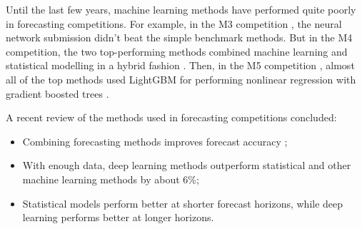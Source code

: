 \documentclass[a4paper,10pt]{article}
\begin{document}
Until the last few years, machine learning methods have performed quite poorly in forecasting competitions. For example, in the M3 competition \citep{M3comp}, the neural network submission didn't beat the simple benchmark methods. But in the M4 competition, the two top-performing methods combined machine learning and statistical modelling in a hybrid fashion \citep{M4results}. Then, in the M5 competition \citep{M5accuracy}, almost all of the top methods used LightGBM for performing nonlinear regression with gradient boosted trees \citep{lightgbm}.

A recent review of the methods used in forecasting competitions \citep{Makridakis2022} concluded:
\begin{itemize}
	\item Combining forecasting methods improves forecast accuracy \citep[see also][]{combinations};
	\item With enough data, deep learning methods outperform statistical and other machine learning methods by about 6\%;
	\item Statistical models perform better at shorter forecast horizons, while deep learning performs better at longer horizons.
\end{itemize}



\end{document}
